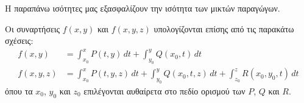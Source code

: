 \begin{rem}
    Η παραπάνω ισότητες μας εξασφαλίζουν την ισότητα των μικτών παραγώγων.
\end{rem}

\begin{rem}
	Οι συναρτήσεις  $ f(x,y) $  και  $ f(x,y,z) $ υπολογίζονται επίσης από τις παρακάτω σχέσεις:
	\begin{align*} 
	f(x,y) &= \int_{x_{0}}^{x} P(t,y) \,{dt} + \int_{y_{0}}^{y} Q(x_{0},t) \,{dt} \\
	f(x,y,z) &= \int_{x_{0}}^{x} P(t,y,z) \,{dt} + \int_{y_{0}}^{y} Q(x_{0},t,z) \,{dt} + \int
		 _{z_{0}}^{z} R(x_{0},y_{0},t) \,{dt}  
\end{align*} 
όπου τα   $ x_{0} $, $ y_{0} $  και  $ z_{0} $  επιλέγονται αυθαίρετα στο πεδίο ορισμού των  $ P
$, $ Q $  και  $ R $.
\end{rem}




	
